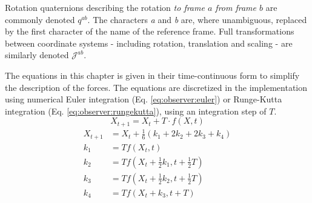         Rotation quaternions describing the rotation \textit{to frame \textbf{$a$} from frame \textbf{$b$}}
        are commonly denoted $q^{ab}$.
        The characters \textit{a} and \textit{b} are, where unambiguous, replaced by the first character of the
        name of the reference frame.
        Full transformations between coordinate systems - including rotation, translation and scaling -
        are similarly denoted $\mathcal{J}^{ab}$.

        The equations in this chapter is given in their time-continuous form
        to simplify the description of the forces.
        The equations are discretized in the implementation using numerical Euler integration (Eq. \eqref{eq:observer:euler})
        or Runge-Kutta integration (Eq. \eqref{eq:observer:rungekutta}), using an integration step of $T$.
        \begin{equation}
        \label{eq:observer:euler}
            X_{t+1} = X_{t} + T \cdot f(X,t)
        \end{equation}
        \begin{subequations}
        \label{eq:observer:rungekutta}
            \begin{align}
                X_{t+1} &= X_{t} + \tfrac{1}{6} \left(k_1 + 2k_2 + 2k_3 + k_4 \right) \\
                k_1 &= Tf(X_{t}, t) \\
                k_2 &= Tf(X_{t} + \tfrac{1}{2} k_1, t + \tfrac{1}{2}T) \\
                k_3 &= Tf(X_{t} + \tfrac{1}{2} k_2, t + \tfrac{1}{2}T) \\
                k_4 &= Tf(X_{t} + k_3, t + T)
            \end{align}
        \end{subequations}

